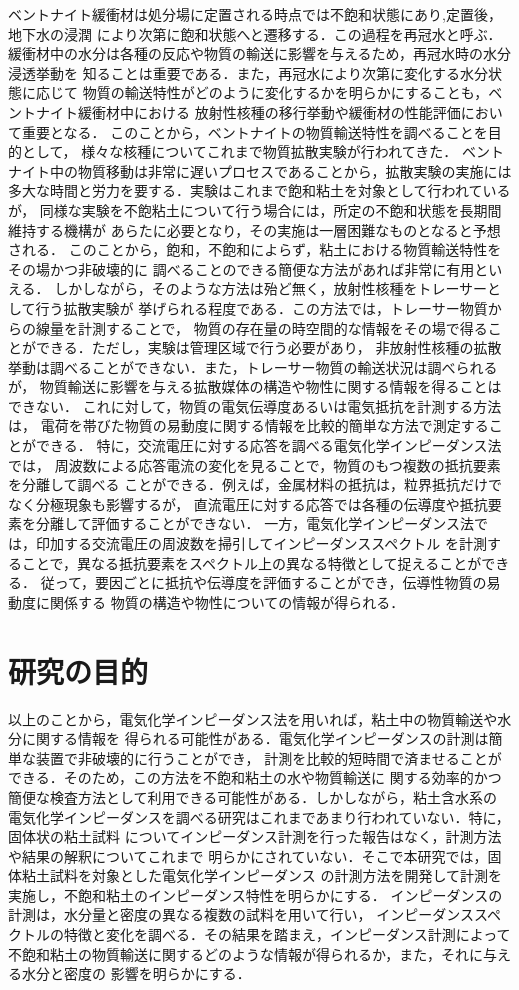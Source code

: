 ベントナイト緩衝材は処分場に定置される時点では不飽和状態にあり,定置後，地下水の浸潤
により次第に飽和状態へと遷移する．この過程を再冠水と呼ぶ．
緩衝材中の水分は各種の反応や物質の輸送に影響を与えるため，再冠水時の水分浸透挙動を
知ることは重要である．また，再冠水により次第に変化する水分状態に応じて
物質の輸送特性がどのように変化するかを明らかにすることも，ベントナイト緩衝材中における
放射性核種の移行挙動や緩衝材の性能評価において重要となる．
このことから，ベントナイトの物質輸送特性を調べることを目的として，
様々な核種についてこれまで物質拡散実験が行われてきた．
ベントナイト中の物質移動は非常に遅いプロセスであることから，拡散実験の実施には
多大な時間と労力を要する．実験はこれまで飽和粘土を対象として行われているが，
同様な実験を不飽粘土について行う場合には，所定の不飽和状態を長期間維持する機構が
あらたに必要となり，その実施は一層困難なものとなると予想される．
このことから，飽和，不飽和によらず，粘土における物質輸送特性をその場かつ非破壊的に
調べることのできる簡便な方法があれば非常に有用といえる．
しかしながら，そのような方法は殆ど無く，放射性核種をトレーサーとして行う拡散実験が
挙げられる程度である．この方法では，トレーサー物質からの線量を計測することで，
物質の存在量の時空間的な情報をその場で得ることができる．ただし，実験は管理区域で行う必要があり，
非放射性核種の拡散挙動は調べることができない．また，トレーサー物質の輸送状況は調べられるが，
物質輸送に影響を与える拡散媒体の構造や物性に関する情報を得ることはできない．
これに対して，物質の電気伝導度あるいは電気抵抗を計測する方法は，
電荷を帯びた物質の易動度に関する情報を比較的簡単な方法で測定することができる．
特に，交流電圧に対する応答を調べる電気化学インピーダンス法では，
周波数による応答電流の変化を見ることで，物質のもつ複数の抵抗要素を分離して調べる
ことができる．例えば，金属材料の抵抗は，粒界抵抗だけでなく分極現象も影響するが，
直流電圧に対する応答では各種の伝導度や抵抗要素を分離して評価することができない．
一方，電気化学インピーダンス法では，印加する交流電圧の周波数を掃引してインピーダンススペクトル
を計測することで，異なる抵抗要素をスペクトル上の異なる特徴として捉えることができる．
従って，要因ごとに抵抗や伝導度を評価することができ，伝導性物質の易動度に関係する
物質の構造や物性についての情報が得られる．
\section{研究の目的}
以上のことから，電気化学インピーダンス法を用いれば，粘土中の物質輸送や水分に関する情報を
得られる可能性がある．電気化学インピーダンスの計測は簡単な装置で非破壊的に行うことができ，
計測を比較的短時間で済ませることができる．そのため，この方法を不飽和粘土の水や物質輸送に
関する効率的かつ簡便な検査方法として利用できる可能性がある．しかしながら，粘土含水系の
電気化学インピーダンスを調べる研究はこれまであまり行われていない．特に，固体状の粘土試料
についてインピーダンス計測を行った報告はなく，計測方法や結果の解釈についてこれまで
明らかにされていない．そこで本研究では，固体粘土試料を対象とした電気化学インピーダンス
の計測方法を開発して計測を実施し，不飽和粘土のインピーダンス特性を明らかにする．
インピーダンスの計測は，水分量と密度の異なる複数の試料を用いて行い，
インピーダンススペクトルの特徴と変化を調べる．その結果を踏まえ，インピーダンス計測によって
不飽和粘土の物質輸送に関するどのような情報が得られるか，また，それに与える水分と密度の
影響を明らかにする．
